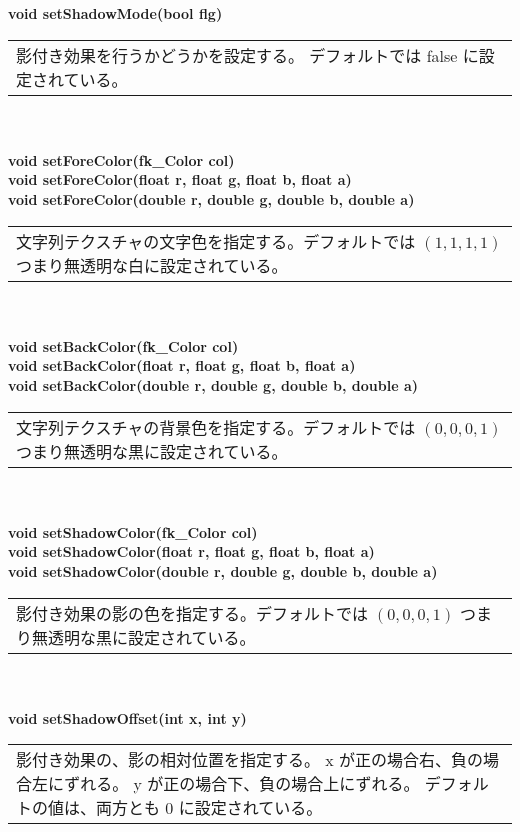 \begin{tabbing}
\> \textbf{void setShadowMode(bool flg)} \\
	\> \> \begin{tabular}{p{15cm}}
		影付き効果を行うかどうかを設定する。
		デフォルトでは false に設定されている。
	\end{tabular} \\ \\

\> \textbf{void setForeColor(fk\_Color col)} \\
\> \textbf{void setForeColor(float r, float g, float b, float a)} \\
\> \textbf{void setForeColor(double r, double g, double b, double a)} \\
	\> \> \begin{tabular}{p{15cm}}
		文字列テクスチャの文字色を指定する。デフォルトでは
		\((1, 1, 1, 1)\) つまり無透明な白に設定されている。
	\end{tabular} \\ \\

\> \textbf{void setBackColor(fk\_Color col)} \\
\> \textbf{void setBackColor(float r, float g, float b, float a)} \\
\> \textbf{void setBackColor(double r, double g, double b, double a)} \\
	\> \> \begin{tabular}{p{15cm}}
		文字列テクスチャの背景色を指定する。デフォルトでは
		\((0, 0, 0, 1)\) つまり無透明な黒に設定されている。
	\end{tabular} \\ \\

\> \textbf{void setShadowColor(fk\_Color col)} \\
\> \textbf{void setShadowColor(float r, float g, float b, float a)} \\
\> \textbf{void setShadowColor(double r, double g, double b, double a)} \\
	\> \> \begin{tabular}{p{15cm}}
		影付き効果の影の色を指定する。デフォルトでは
		\((0, 0, 0, 1)\) つまり無透明な黒に設定されている。
	\end{tabular} \\ \\

\> \textbf{void setShadowOffset(int x, int y)} \\
	\> \> \begin{tabular}{p{15cm}}
		影付き効果の、影の相対位置を指定する。
		x が正の場合右、負の場合左にずれる。
		y が正の場合下、負の場合上にずれる。
		デフォルトの値は、両方とも 0 に設定されている。
	\end{tabular} \\ \\


\end{tabbing}
